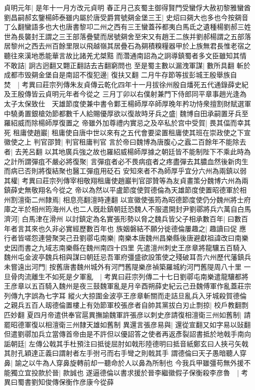 貞明元年|{
	是年十一月方改元貞明}
春正月己亥蜀主御得賢門受蠻俘大赦初黎雅蠻酋劉昌嗣郝玄鑒楊師泰雖内屬於唐受爵賞號㚋金堡三王|{
	史炤曰㚋大也多也今按㚋音丁么翻蠻語多也大也唐書黎卭二州之西有三王蠻蓋莋都夷白馬氐之遺種楊劉郝三姓世為長襲封王謂之三王部落疊甓而居號㚋舍至宋又有趙王二族并劉郝楊謂之五部落居黎州之西去州百餘里限以飛越嶺其居疊石為㚋積糗糧器甲於上族無君長惟老宿之聽往來漢地悉能華言故比諸羌尤桀黠}
而濳通南詔為之詗導鎮蜀者多文臣雖知其情不敢詰|{
	詗古迥翻又翾正翻詰去吉翻窮問也}
至是蜀主數以漏洩軍謀|{
	數所具翻}
斬於成都市毁㚋金堡自是南詔不復犯邊|{
	復扶又翻}
二月牛存節等拔彭城王殷舉族自焚　|{
	考異曰莊宗列傳朱友貞傳云乾化四年十一月拔徐州殷自燔死五代通錄薛史紀及王殷傳皆云貞明元年者今從之}
三月丁卯以右僕射兼門下侍郎同平章事趙光逢為太子太保致仕　天雄節度使兼中書令鄴王楊師厚卒師厚晚年矜功恃衆擅割財賦選軍中驍勇置銀槍効節都數千人給賜優厚欲以復故時牙兵之盛|{
	魏博自田承嗣置牙兵至羅紹威而除楊師厚復置之}
帝雖外加尊禮内實忌之及卒私於宫中受賀|{
	畏其偪而幸其死}
租庸使趙巖|{
	租庸使自唐中世以來有之五代會要梁置租庸使其班在崇政使之下宣徽使之上}
判官邵贊|{
	判官租庸判官}
言於帝曰魏博為唐腹心之蠧二百餘年不能除去者|{
	去羌呂翻}
以其地廣兵強之故也羅紹威楊師厚據之朝廷皆不能制陛下不乘此時為之計所謂彈疽不嚴必將復聚|{
	言彈疽者必不畏病疽者之疼盡彈去其膿血然後新肉生而病已否則將復結聚也醫工彈疽用砭石}
安知來者不為師厚乎宜分六州為兩鎮以弱其權|{
	考異曰莊宗列傳宰相敬翔租庸使趙巖判官邵贊等為友貞畫策分魏博六州為兩鎮薛史無敬翔名今從之}
帝以為然以平盧節度使賀德倫為天雄節度使置昭德軍於相州割澶衛二州隸焉|{
	相息亮翻澶時連翻}
以宣徽使張筠為昭德節度使仍分魏州將士府庫之半於相州筠海州人也二人旣赴鎮朝廷恐魏人不服遣開封尹劉鄩將兵六萬自白馬濟河|{
	白馬津在滑州}
以討鎮定為名實張形勢以脅之魏兵皆父子相承數百年|{
	曰數百年者言其來也久非必實經歷數百年也}
族姻磐結不願分徙德倫屢趣之|{
	趣讀曰促}
應行者皆嗟怨連營聚哭己丑劉鄩屯南樂|{
	南樂本唐魏州昌樂縣後唐避獻祖諱改曰南樂史因而書之九域志南樂縣在魏州南四十四里}
先遣澶州刺史王彦章將龍驤五百騎入魏州屯金波亭魏兵相與謀曰朝廷忌吾軍府彊盛欲設策使之殘破耳吾六州歷代藩鎮兵未嘗遠出河門|{
	按舊唐書魏州城外有河門舊隄樂彦禎築羅城約河門舊隄周八十里}
一旦骨肉流離生不如死是夕軍亂　|{
	考異曰莊宗列傳二十七日劉鄩屯南樂遣龍驤都將王彦章以五百騎入魏州是夜三鼓魏軍亂是月辛酉朔薛史紀云己丑魏傅軍作亂蓋莊宗列傳九字誤為七字耳}
縱火大掠圍金波亭王彦章斬關而走詰旦亂兵入牙城殺賀德倫之親兵五百人刼德倫置樓上有効節軍校張彦者自帥其黨拔白刃止剽掠|{
	校戶教翻剽匹妙翻}
夏四月帝遣供奉官扈異撫諭魏軍許張彦以刺史彦請復相澶衛三州如舊制|{
	請罷昭德軍復以相澶衛三州隸天雄如舊制}
異還言張彦易與|{
	還從宣翻又如字易以䜴翻}
但遣劉鄩加兵立當傳首帝由是不許但以優詔答之使者再返彥裂詔書抵於地戟手南向詬朝廷|{
	左傳公戟其手杜預注曰抵徙屈肘如戟形陸德明曰抵音紙鄭玄曰人挾弓矢戟其肘孔穎達正義曰謂射者左手弣弓而右手彎之則戟其手}
謂德倫曰天子愚暗聽人穿鼻|{
	諭之以牛為人穿鼻旋轉前却一聽命於人以鼻為所制也}
今我兵甲雖彊苟無外援不能獨立宜投款於晉|{
	款誠也}
遂逼德倫以書求援於晉李繼徽假子保衡殺李彦魯　|{
	考異曰蜀書劉知俊傳保衡作彦康今從薛}


